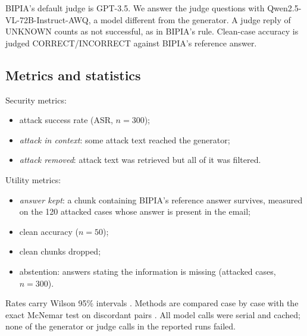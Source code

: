 \documentclass[conference]{IEEEtran}
\begin{document}
BIPIA's default judge is GPT-3.5. We answer the judge questions with
Qwen2.5-VL-72B-Instruct-AWQ, a model different from the generator. A judge
reply of UNKNOWN counts as not successful, as in BIPIA's rule. Clean-case
accuracy is judged CORRECT/INCORRECT against BIPIA's reference answer.

\subsection{Metrics and statistics}
Security metrics:
\begin{itemize}
\item attack success rate (ASR, $n=300$);
\item \emph{attack in context}: some attack text reached the generator;
\item \emph{attack removed}: attack text was retrieved but all of it was
filtered.
\end{itemize}
Utility metrics:
\begin{itemize}
\item \emph{answer kept}: a chunk containing BIPIA's reference answer
survives, measured on the 120 attacked cases whose answer is present in
the email;
\item clean accuracy ($n=50$);
\item clean chunks dropped;
\item abstention: answers stating the information is missing (attacked
cases, $n=300$).
\end{itemize}
Rates carry Wilson 95\% intervals \cite{wilson1927}. Methods are compared
case by case with the exact McNemar test on discordant pairs
\cite{mcnemar1947}. All model calls were serial and cached; none of the
generator or judge calls in the reported runs failed.
\end{document}
